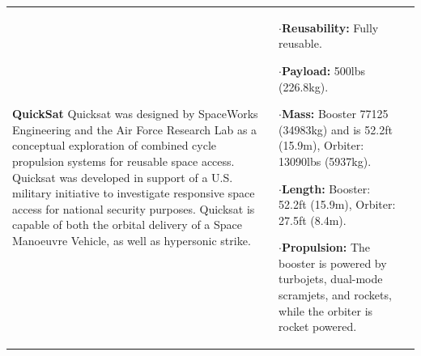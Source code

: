 {\begin{landscape}
\begin{xltabular}{\linewidth}{|X|X|X|}
	\\
	\hline \small 
	\textbf{QuickSat}\cite{Eklund2012}\newline\newline
Quicksat was designed by SpaceWorks Engineering and the Air Force Research Lab as a conceptual exploration of combined cycle propulsion systems for reusable space access. Quicksat was developed in support of a U.S. military initiative to investigate responsive space access for national security purposes. Quicksat is capable of both the orbital delivery of a Space Manoeuvre Vehicle, as well as hypersonic strike. 
	&\small
	
	$\cdot$\textbf{Reusability:} Fully reusable. 
	
	$\cdot$\textbf{Payload:} 500lbs (226.8kg). 
	
	$\cdot$\textbf{Mass:} Booster 77125 (34983kg) and is 52.2ft (15.9m), Orbiter: 13090lbs (5937kg).
	
	$\cdot$\textbf{Length:} Booster: 52.2ft (15.9m), Orbiter: 27.5ft (8.4m).
	
	$\cdot$\textbf{Propulsion:} The booster is powered by turbojets, dual-mode scramjets, and rockets, while the orbiter is rocket powered.
	
	&\small
	

\end{xltabular}
\end{landscape}}

